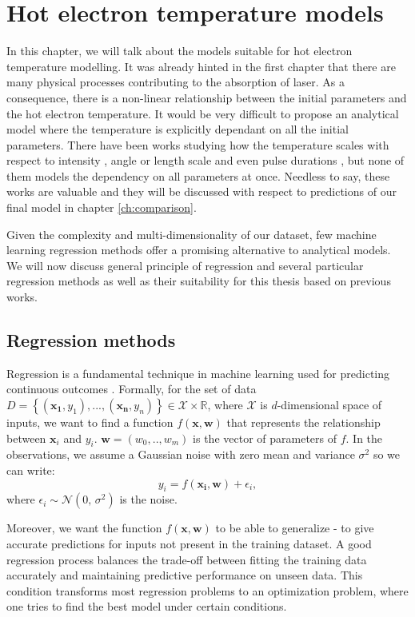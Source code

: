 \chapter{Hot electron temperature models}
In this chapter, we will talk about the models suitable for hot electron temperature modelling. It was already hinted in the first chapter that there are many physical processes contributing to the absorption of laser. As a consequence, there is a non-linear relationship between the initial parameters and the hot electron temperature. It would be very difficult to propose an analytical model where the temperature is explicitly dependant on all the initial parameters. There have been works studying how the temperature scales with respect to intensity \cite{kluge2011,cui2013,miller2023,haines2009,beg1997}, angle \cite{cui2013} or length scale and even pulse durations \cite{miller2023}, but none of them models the dependency on all parameters at once. Needless to say, these works are valuable and they will be discussed with respect to predictions of our final model in chapter \ref{ch:comparison}.

Given the complexity and multi-dimensionality of our dataset, few machine learning regression methods offer a promising alternative to analytical models. We will now discuss general principle of regression and several particular regression methods as well as their suitability for this thesis based on previous works.

\section{Regression methods}
Regression is a fundamental technique in machine learning used for predicting continuous outcomes \cite{bishop2006}. Formally, for the set of data $D = \left\{(\bm{x_1},y_1),...,(\bm{x_n},y_n)\right\}\in \mathcal{X}\times\mathbb{R}$, where $\mathcal{X}$ is $d$-dimensional space of inputs, we want to find a function $f(\bm{x},\bm{w})$ that represents the relationship between $\bm{x}_i$ and $y_i$. $\bm{w} = (w_0,..,w_{m})$ is the vector of parameters of $f$. In the observations, we assume a Gaussian noise with zero mean and variance $\sigma^2$ so we can write:
\begin{equation}
	y_i = f(\bm{x_i},\bm{w}) + \epsilon_i,
\end{equation}
where $\epsilon_i \sim \mathcal{N}(0,\,\sigma^{2})$ is the noise.

Moreover, we want the function $f(\bm{x},\bm{w})$ to be able to generalize - to give accurate predictions for inputs not present in the training dataset. A good regression process balances the trade-off between fitting the training data accurately and maintaining predictive performance on unseen data. This condition transforms most regression problems to an optimization problem, where one tries to find the best model under certain conditions.


